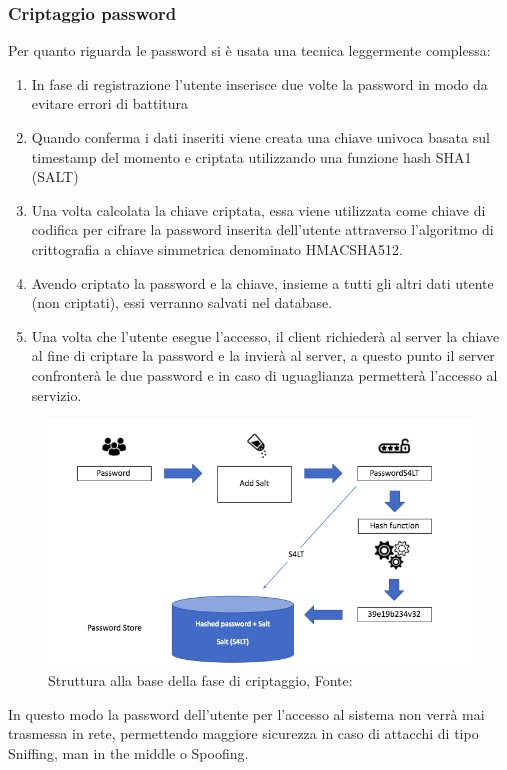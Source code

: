 \documentclass[a4paper,final,12pt]{report}
\begin{document}
\subsubsection{Criptaggio password} 
Per quanto riguarda le password si è usata una tecnica leggermente complessa:
\begin{enumerate}
\item In fase di registrazione l'utente inserisce due volte la password in modo da evitare errori di battitura
\item Quando conferma i dati inseriti viene creata una chiave univoca basata sul timestamp del momento e criptata utilizzando una funzione hash SHA1 (SALT)
\item Una volta calcolata la chiave criptata, essa viene utilizzata come chiave di codifica per cifrare la password inserita dell'utente attraverso l'algoritmo di crittografia a chiave simmetrica denominato HMACSHA512. 
\item Avendo criptato la password e  la chiave, insieme a tutti gli altri dati utente (non criptati), essi verranno salvati nel database.
\item Una volta che l'utente esegue l'accesso, il client richiederà al server la chiave al fine di criptare la password e la invierà al server, a questo punto il server confronterà le due password e in caso di uguaglianza permetterà l'accesso al servizio.
\end{enumerate}
\begin{figure}[hbtp]
\centering
\includegraphics[scale=0.50]{img_concettuale/sale.png}
\caption{Struttura alla base della fase di criptaggio, Fonte: \cite{okta}}
\end{figure}
In questo modo la password dell'utente per l'accesso al sistema non verrà mai trasmessa in rete, permettendo maggiore sicurezza in caso di attacchi di tipo Sniffing, man in the middle o Spoofing.  
\end{document}
